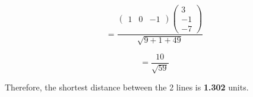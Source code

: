 \documentclass[journal,12pt,twocolumn]{IEEEtran}
\begin{document}
\begin{equation}
     = \frac{\begin{pmatrix}1 & 0 & -1 \end{pmatrix} 
     \begin{pmatrix}
3 \\ 
-1 \\ 
-7 
\end{pmatrix}}{\sqrt{9 + 1 + 49}}
\end{equation}

\begin{equation}
    = \frac{10}{\sqrt{59}}
\end{equation}

Therefore, the shortest distance between the 2 lines is \textbf{1.302} units.


\end{document}
